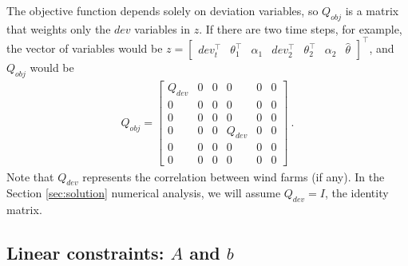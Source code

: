 \documentclass[conference]{IEEEtran}
\begin{document}
The objective function depends solely on deviation variables, so $Q_{obj}$ is a matrix that weights only the $dev$ variables in $z$. If there are two time steps, for example, the vector of variables would be $z = \begin{bmatrix}dev_t^\top & \theta_1^\top & \alpha_1 & dev_2^\top & \theta_2^\top & \alpha_2 & \hat{\theta}\end{bmatrix}^\top$, and $Q_{obj}$ would be
\begin{align*}
Q_{obj} = \begin{bmatrix} Q_{dev} & 0 & 0 & 0 & 0 & 0 \\ 0 & 0 & 0 & 0 & 0 & 0 \\ 0 & 0  & 0 & 0 & 0 & 0 \\ 0 & 0 & 0 & Q_{dev} & 0 & 0 \\ 0 & 0 & 0 & 0 & 0 & 0 \\ 0 & 0 & 0 & 0 & 0 & 0\end{bmatrix}~.
\end{align*}
Note that $Q_{dev}$ represents the correlation between wind farms (if any). In the Section \ref{sec:solution} numerical analysis, we will assume $Q_{dev}=I$, the identity matrix.

\subsection{Linear constraints: $A$ and $b$}\label{sec:Ax=b}
\end{document}
